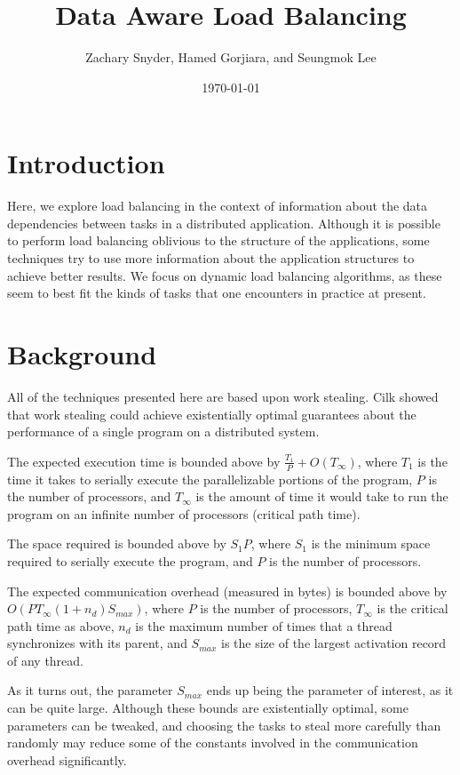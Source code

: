 \documentclass{article}
\title{Data Aware Load Balancing}
\author{Zachary Snyder, Hamed Gorjiara, and Seungmok Lee}
\date{\today}
\begin{document}
\maketitle

\section*{Introduction}

Here, we explore load balancing in the context of information about the data
dependencies between tasks in a distributed application.  Although it is
possible to perform load balancing oblivious to the structure of the
applications, some techniques try to use more information about the application
structures to achieve better results.  We focus on dynamic load balancing
algorithms, as these seem to best fit the kinds of tasks that one encounters in
practice at present.

\section*{Background}

All of the techniques presented here are based upon work stealing.  Cilk
\autocite{RDBCEL1999} showed that work stealing could achieve existentially
optimal guarantees about the performance of a single program on a distributed
system.

The expected execution time is bounded above by \(\frac{T_1}{P} + O
(T_\infty)\), where \(T_1\) is the time it takes to serially execute the
parallelizable portions of the program, \(P\) is the number of processors, and
\(T_\infty\) is the amount of time it would take to run the program on an
infinite number of processors (critical path time).

The space required is bounded above by \(S_1 P\), where \(S_1\) is the minimum
space required to serially execute the program, and \(P\) is the number of
processors.

The expected communication overhead (measured in bytes) is bounded above by
\(O(P T_\infty (1 + n_d) S_{max} )\), where \(P\) is the number of processors,
\(T_\infty\) is the critical path time as above, \(n_d\) is the maximum number
of times that a thread synchronizes with its parent, and \(S_{max}\) is the size
of the largest activation record of any thread.

As it turns out, the parameter \(S_{max}\) ends up being the parameter of
interest, as it can be quite large.  Although these bounds are existentially
optimal, some parameters can be tweaked, and choosing the tasks to steal more
carefully than randomly may reduce some of the constants involved in the
communication overhead significantly.
\end{document}
